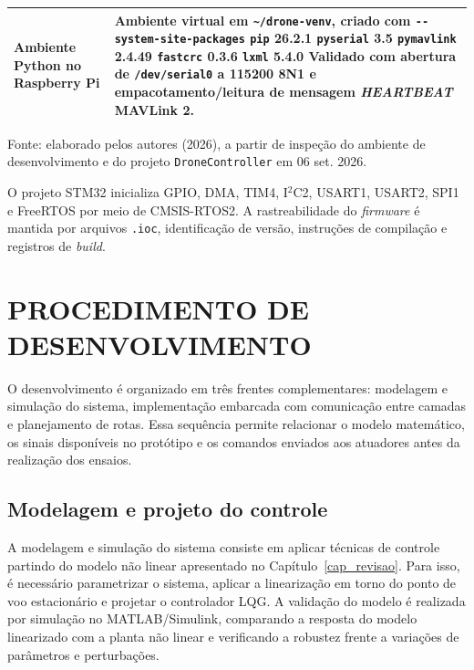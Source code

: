 \begin{quadro}[htb]
\begin{tabular}{
  |
  >{\raggedright\arraybackslash}p{4.5cm}
  |
  >{\raggedright\arraybackslash}p{10.0cm}
  |
}
Ambiente Python no Raspberry Pi &
Ambiente virtual em \texttt{\textasciitilde{}/drone-venv}, criado com \texttt{-{}-system-site-packages}\newline
\texttt{pip} 26.2.1\newline
\texttt{pyserial} 3.5\newline
\texttt{pymavlink} 2.4.49\newline
\texttt{fastcrc} 0.3.6\newline
\texttt{lxml} 5.4.0\newline
Validado com abertura de \texttt{/dev/serial0} a 115200 8N1 e empacotamento/leitura de mensagem \textit{HEARTBEAT} MAVLink 2. \\
\hline
\end{tabular}
\par\vspace{0.2cm}
\footnotesize Fonte: elaborado pelos autores (2026), a partir de inspeção do ambiente de desenvolvimento e do projeto \texttt{DroneController} em 06 set. 2026.
\end{quadro}

O projeto STM32 inicializa GPIO, DMA, TIM4, I$^2$C2, USART1, USART2, SPI1 e FreeRTOS por meio de CMSIS-RTOS2. A rastreabilidade do \textit{firmware} é mantida por arquivos \texttt{.ioc}, identificação de versão, instruções de compilação e registros de \textit{build}.

\section{PROCEDIMENTO DE DESENVOLVIMENTO}\label{sec:procedimento_desenvolvimento}

O desenvolvimento é organizado em três frentes complementares: modelagem e simulação do sistema, implementação embarcada com comunicação entre camadas e planejamento de rotas. Essa sequência permite relacionar o modelo matemático, os sinais disponíveis no protótipo e os comandos enviados aos atuadores antes da realização dos ensaios.

\subsection{Modelagem e projeto do controle}\label{subsec:modelagem_projeto_controle}

A modelagem e simulação do sistema consiste em aplicar técnicas de controle partindo do modelo não linear apresentado no Capítulo~\ref{cap_revisao}. Para isso, é necessário parametrizar o sistema, aplicar a linearização em torno do ponto de voo estacionário e projetar o controlador LQG. A validação do modelo é realizada por simulação no MATLAB/Simulink, comparando a resposta do modelo linearizado com a planta não linear e verificando a robustez frente a variações de parâmetros e perturbações. 

